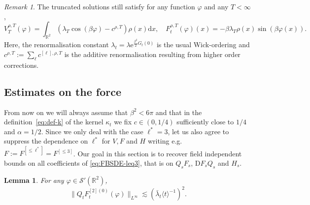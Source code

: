 \documentclass[11pt, a4paper]{scrartcl}
\numberwithin{equation}{section}
\theoremstyle{plain}
\newtheorem{lemma}[foo]{Lemma}
\theoremstyle{remark}
\newtheorem{remark}[foo]{Remark}
\newcommand{\assign}{:=}
\newcommand{\mathD}{\mathrm{D}}
\newcommand{\mathd}{\mathrm{d}}
\newcommand{\mathe}{\mathrm{e}}
\begin{document}
\begin{remark}
	The truncated solutions still satisfy for any function $\varphi$ and any $T
		< \infty$,
	\begin{equation}
		V^{\rho, T}_T (\varphi) = \int_{\mathbb{R}^2} (\lambda_T \cos (\beta
		\varphi) - c^{\rho, T}) \rho (x) \mathd x, \quad F^{\rho, T}_t (\varphi)
		(x) = - \beta \lambda_T \rho (x) \sin (\beta \varphi (x)) . \label{eq:FTT}
	\end{equation}
	Here, the renormalisation constant $\lambda_t = \lambda
		\mathe^{\frac{\beta^2}{2} G_t (0)}$ is the usual Wick-ordering and $c^{\rho,
				T} \assign \sum_{\ell} c^{[\ell], \rho, T}$ is the additive renormalisation
	resulting from higher order corrections.
\end{remark}

\subsection{Estimates on the force}\label{sec:F-estimates}

From now on we will always assume that $\beta^2 < 6 \pi$ and that in the
definition~\eqref{eq:def-k} of the kernel $\kappa_t$ we fix $c \in (0, 1 / 4)$
sufficiently close to $1 / 4$ and $\alpha = 1 / 2$. Since we only deal with
the case $\ell^{\ast} = 3$, let us also agree to suppress the dependence on
$\ell^{\ast}$ for $V, F$ and $H$ writing e.g. \ $F \assign F^{[\leqslant
					\ell^{\ast}]} = F^{[\leqslant 3]}$. Our goal in this section is to recover
field independent bounds on all coefficients of \eqref{eq:FBSDE-leq3}, that is
on $Q_s F_s$, $\mathD F_s Q_s$ and $H_s$.

\begin{lemma}
	\label{lem:F2-uniform-bounds}For any $\varphi \in \mathcal{S}'
		(\mathbb{R}^2)$,
	\[ \| Q_t F_t^{[2] (0)} (\varphi) \|_{L^{\infty}} \lesssim (\bar{\lambda}_t
		\langle t \rangle^{- 1})^2 . \]
\end{lemma}
\end{document}

